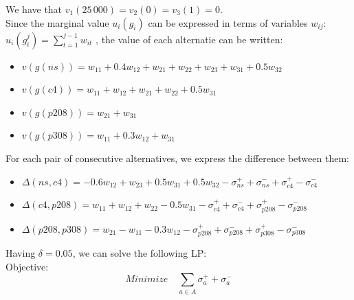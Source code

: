 \documentclass{report}
\begin{document}
We have that $v_1(25\,000) = v_2(0) = v_3(1) = 0$. \\
Since the marginal value $u_i(g_i)$ can be expressed in terms of variables $w_{ij}$: $u_i(g_i^{j}) = \sum _{t=1}^{j-1} w_{it}$ , the value of each alternatie can be written: 
\begin{itemize}
\item $v(g(ns)) = w_{11} + 0.4w_{12} + w_{21} + w_{22} + w_{23} + w_{31} + 0.5w_{32}$
\item $v(g(c4)) = w_{11} + w_{12} + w_{21} + w_{22} + 0.5w_{31}$
\item $v(g(p208)) = w_{21} + w_{31} $
\item $v(g(p308)) = w_{11} + 0.3w_{12} + w_{31}$
\end{itemize}
For each pair of consecutive alternatives, we express the difference between them: 
\begin{itemize}
\item $\Delta (ns,c4) =  -0.6w_{12} + w_{23} + 0.5w_{31} +  0.5w_{32}  -\sigma _{ns}^{+} +\sigma _{ns}^{-} +\sigma _{c4}^{+} - \sigma _{c4}^{-} $
\item $\Delta (c4, p208) = w_{11} + w_{12} + w_{22} - 0.5w_{31} -\sigma _{c4}^{+} +\sigma _{c4}^{-} +\sigma _{p208}^{+} - \sigma _{p208}^{-} $
\item $\Delta (p208, p308) =w_{21} - w_{11} - 0.3w_{12} -\sigma _{p208}^{+} +\sigma _{p208}^{-} +\sigma _{p308}^{+} - \sigma _{p308}^{-} $
\end{itemize}
Having $\delta = 0.05$, we can solve the following LP:\\

Objective:  
\begin{equation}
	Minimize \quad \sum_{a \in A} \sigma _{a}^{+} + \sigma _{a}^{-}
\end{equation}
\end{document}
